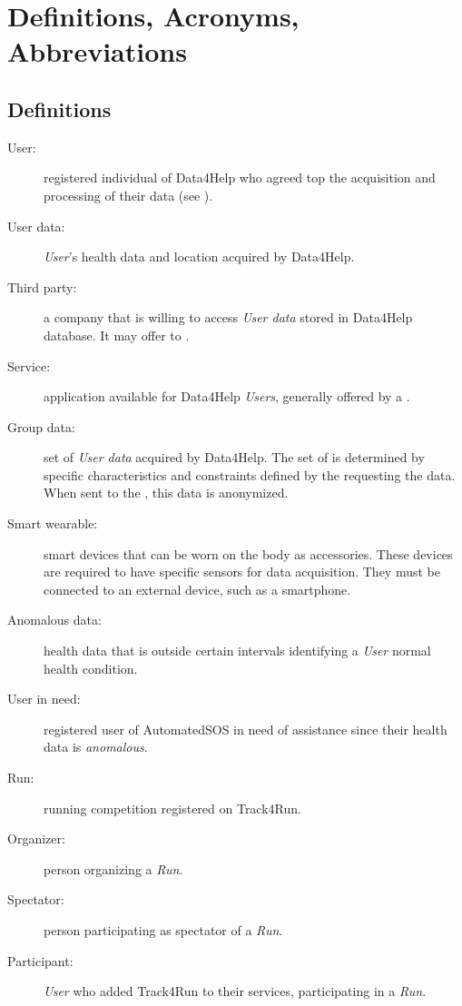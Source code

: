 \documentclass[../../DD.tex]{subfiles}
\begin{document}
\section{Definitions, Acronyms, Abbreviations}
		\subsection{Definitions}
		\begin{description}
			\item[User:]registered individual of Data4Help who agreed top the acquisition and processing of their data (see ).
			\item[User data:]\textit{User}'s health data and location acquired by Data4Help.
			\item[Third party:]a company that is willing to access \textit{User data} stored in Data4Help database. It may offer  to .
			\item[Service:]application available for Data4Help \textit{Users}, generally offered by a .
			\item[Group data:]set of \textit{User data} acquired by Data4Help. The set of  is determined by specific characteristics and constraints defined by the  requesting the data. When sent to the , this data is anonymized.
			\item[Smart wearable:]smart devices that can be worn on the body as accessories. These devices are required to have specific sensors for data acquisition. They must be connected to an external device, such as a smartphone.
			\item[Anomalous data:]health data that is outside certain intervals identifying a \textit{User} normal health condition.
			\item[User in need:]registered user of AutomatedSOS in need of assistance since their health data is \textit{anomalous}.
			\item[Run:]running competition registered on Track4Run. 
			\item[Organizer:]person organizing a \textit{Run}.
			\item[Spectator:]person participating as spectator of a \textit{Run}.
			\item[Participant:]\textit{User} who added Track4Run to their services, participating in a \textit{Run}.
			
			


		\end{description}
\end{document}
